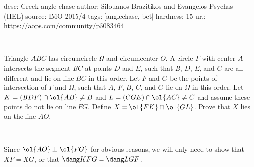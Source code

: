 desc:  Greek angle chase
author: Silouanos Brazitikos and Evangelos Psychas (HEL)
source:  IMO 2015/4
tags:  [anglechase, bet]
hardness: 15
url: https://aops.com/community/p5083464

---

Triangle $ABC$ has circumcircle $\Omega$ and circumcenter $O$.
A circle $\Gamma$ with center $A$
intersects the segment $BC$ at points $D$ and $E$,
such that $B$, $D$, $E$, and $C$ are all different
and lie on line $BC$ in this order.
Let $F$ and $G$ be the points of intersection of $\Gamma$ and $\Omega$,
such that $A$, $F$, $B$, $C$, and $G$ lie on $\Omega$ in this order.
Let $K = (BDF) \cap \ol{AB} \neq B$
and $L = (CGE) \cap \ol{AC} \neq C$
and assume these points do not lie on line $FG$.
Define $X = \ol{FK} \cap \ol{GL}$.
Prove that $X$ lies on the line $AO$.

---

Since $\ol{AO} \perp \ol{FG}$ for obvious reasons,
we will only need to show that $XF = XG$,
or that $\dang KFG = \dang LGF$.

